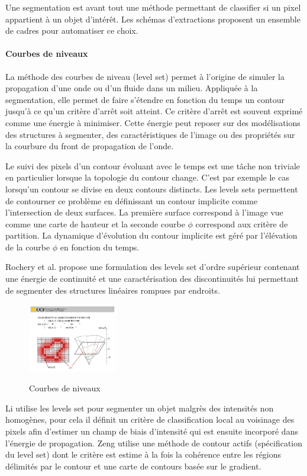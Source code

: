 Une segmentation est avant tout une méthode permettant de classifier si un pixel appartient à un objet d'intérêt. Les schémas d'extractions proposent un ensemble de cadres pour automatiser ce choix.

\paragraph{Courbes de niveaux}
La méthode des courbes de niveau (level set) permet à l'origine de simuler la propagation d'une onde ou d'un fluide dans un milieu. Appliquée à la segmentation, elle permet de faire s'étendre en fonction du temps un contour jusqu'à ce qu'un critère d'arrêt soit atteint. Ce critère d'arrêt est souvent exprimé comme une énergie à minimiser. Cette énergie peut reposer sur des modélisations des structures à segmenter, des caractéristiques de l'image ou des propriétés sur la courbure du front de propagation de l'onde.

Le suivi des pixels d'un contour évoluant avec le temps est une tâche non triviale en particulier lorsque la topologie du contour change. C'est par exemple le cas lorsqu'un contour se divise en deux contours distincts. Les levels sets permettent de contourner ce problème en définissant un contour implicite comme l'intersection de deux surfaces. La première surface correspond à l'image vue comme une carte de hauteur et la seconde courbe $\phi$ correspond aux critère de partition. La dynamique d'évolution du contour implicite est géré par l'élévation de la courbe $\phi$ en fonction du temps.

Rochery et al. \cite{rochery2006_higher_active_contour} propose une formulation des levels set d'ordre supérieur contenant une énergie de continuité et une caractérisation des discontinuités lui permettant de segmenter des structures linéaires rompues par endroits. 

\begin{figure}
  \centering
  \includegraphics[height=3cm]{Images/level_set_active_contour.jpeg}
  \label{fig:Courbes de niveaux}
  \caption{Courbes de niveaux}
\end{figure}

Li \cite{Li2011_mri_level_set} utilise les levels set pour segmenter un objet malgrès des intensités non homogènes, pour cela il définit un critère de classification local au voisinage des pixels afin d'estimer un champ de biais d'intensité qui est ensuite incorporé dans l'énergie de propagation. Zeng \cite{Zeng2018_liver_hybrid_active_contour_region_growing} utilise une méthode de contour actifs (spécification du level set) dont le critère est estime à la fois la cohérence entre les régions délimités par le contour et une carte de contours basée sur le gradient.


